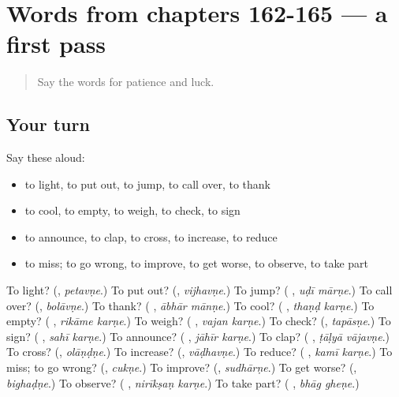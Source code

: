 \section[(dialogue)]{Words from chapters 162-165 — a first pass}

\label{lesson:MR-R170-first-pass-words-from-chapters-162-165}



\begin{quote}
Say the words for patience and luck.
\end{quote}

\subsection*{Your turn}
Say these aloud:

\begin{itemize}
\raggedright
  \item to light, to put out, to jump, to call over, to thank
  \item to cool, to empty, to weigh, to check, to sign
  \item to announce, to clap, to cross, to increase, to reduce
  \item to miss; to go wrong, to improve, to get worse, to observe, to take part
\end{itemize}

\begin{tcolorbox}[breakable,colback=teal!4,colframe=teal!35!black,title={Before you move on}]
To light? (\textbf{}, \emph{petavṇe}.) To put out? (\textbf{}, \emph{vijhavṇe}.) To jump? (\textbf{ }, \emph{uḍī mārṇe}.) To call over? (\textbf{}, \emph{bolāvṇe}.) To thank? (\textbf{ }, \emph{ābhār mānṇe}.) To cool? (\textbf{ }, \emph{thaṇḍ karṇe}.) To empty? (\textbf{ }, \emph{rikāme karṇe}.) To weigh? (\textbf{ }, \emph{vajan karṇe}.) To check? (\textbf{}, \emph{tapāsṇe}.) To sign? (\textbf{ }, \emph{sahī karṇe}.) To announce? (\textbf{ }, \emph{jāhīr karṇe}.) To clap? (\textbf{ }, \emph{ṭāḷyā vājavṇe}.) To cross? (\textbf{}, \emph{olāṇḍṇe}.) To increase? (\textbf{}, \emph{vāḍhavṇe}.) To reduce? (\textbf{ }, \emph{kamī karṇe}.) To miss; to go wrong? (\textbf{}, \emph{cukṇe}.) To improve? (\textbf{}, \emph{sudhārṇe}.) To get worse? (\textbf{}, \emph{bighaḍṇe}.) To observe? (\textbf{ }, \emph{nirīkṣaṇ karṇe}.) To take part? (\textbf{ }, \emph{bhāg gheṇe}.)
\end{tcolorbox}

